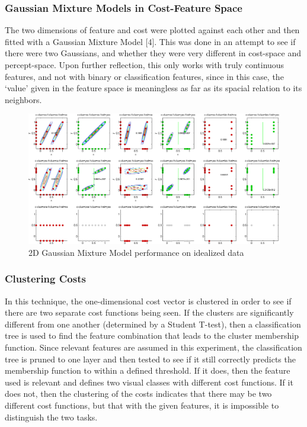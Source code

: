 \documentclass[12pt]{article}
\begin{document}
\subsubsection{Gaussian Mixture Models in Cost-Feature Space}

The two dimensions of feature and cost were plotted against each other and then fitted with a Gaussian Mixture Model [4]. This was done in an attempt to see if there were two Gaussians, and whether they were very different in cost-space and percept-space. Upon further reflection, this only works with truly continuous features, and not with binary or classification features, since in this case, the `value' given in the feature space is meaningless as far as its spacial relation to its neighbors.

\begin{figure}[ht]
  \centerline{
  \includegraphics[width=1.0\columnwidth]{2d_gaussians.png}}
  \caption{\label{fig_2d_gaussians} 2D Gaussian Mixture Model performance on idealized data}
  \label{fig:2Dgaussians}
\end{figure}


\subsubsection{Clustering Costs}

In this technique, the one-dimensional cost vector is clustered in order to see if there are two separate cost functions being seen. If the clusters are significantly different from one another (determined by a Student T-test), then a classification tree is used to find the feature combination that leads to the cluster membership function. Since relevant features are assumed in this experiment, the classification tree is pruned to one layer and then tested to see if it still correctly predicts the membership function to within a defined threshold. If it does, then the feature used is relevant and defines two visual classes with different cost functions. If it does not, then the clustering of the costs indicates that there may be two different cost functions, but that with the given features, it is impossible to distinguish the two tasks. 
\end{document}
